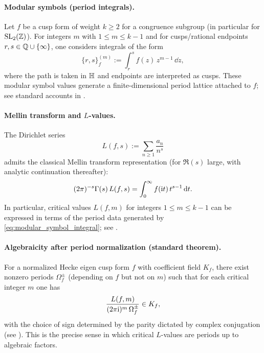 \paragraph{Modular symbols (period integrals).}
Let $f$ be a cusp form of weight $k\ge 2$ for a congruence subgroup (in particular for $\mathrm{SL}_2(\mathbb{Z})$). For integers $m$ with $1\le m\le k-1$ and for cusps/rational endpoints $r,s\in\mathbb{Q}\cup\{\infty\}$, one considers integrals of the form
\begin{equation}
\label{eq:modular_symbol_integral}
\{r,s\}_f^{(m)}:=\int_{r}^{s} f(z)\,z^{m-1}\,\dd z,
\end{equation}
where the path is taken in $\mathbb{H}$ and endpoints are interpreted as cusps. These modular symbol values generate a finite-dimensional period lattice attached to $f$; see standard accounts in \cite{Shimura1971,DiamondShurman2005,Stein2007}.

\paragraph{Mellin transform and \texorpdfstring{$L$}{L}-values.}
The Dirichlet series
\begin{equation}
\label{eq:hecke_L_function}
L(f,s):=\sum_{n\ge 1}\frac{a_n}{n^s}
\end{equation}
admits the classical Mellin transform representation (for $\Re(s)$ large, with analytic continuation thereafter):
\begin{equation}
\label{eq:mellin_L_value}
(2\pi)^{-s}\Gamma(s)\,L(f,s)=\int_0^\infty f(\mathrm{i} t)\,t^{s-1}\,\mathrm{d} t.
\end{equation}
In particular, critical values $L(f,m)$ for integers $1\le m\le k-1$ can be expressed in terms of the period data generated by \eqref{eq:modular_symbol_integral}; see \cite{Shimura1971,Deligne1979,Stein2007}.

\paragraph{Algebraicity after period normalization (standard theorem).}
For a normalized Hecke eigen cusp form $f$ with coefficient field $K_f$, there exist nonzero periods $\Omega_f^\pm$ (depending on $f$ but not on $m$) such that for each critical integer $m$ one has
\begin{equation}
\label{eq:deligne_shimura_algebraicity}
\frac{L(f,m)}{(2\pi\mathrm{i})^m\,\Omega_f^{\pm}}\in K_f,
\end{equation}
with the choice of sign determined by the parity dictated by complex conjugation (see \cite{Deligne1979,Shimura1971}). This is the precise sense in which critical $L$-values are periods up to algebraic factors.

